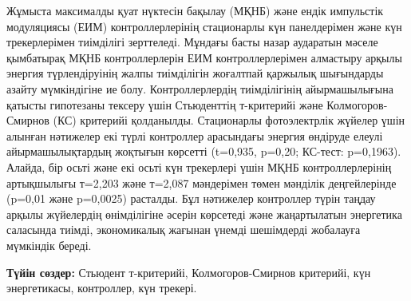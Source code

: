 Жұмыста максималды қуат нүктесін бақылау (МҚНБ) және ендік импульстік
модуляциясы (ЕИМ) контроллерлерінің стационарлы күн панелдерімен және
күн трекерлерімен тиімділігі зерттеледі. Мұндағы басты назар аударатын
мәселе қымбатырақ МҚНБ контроллерлерін ЕИМ контроллерлерімен алмастыру
арқылы энергия түрлендіруінің жалпы тиімділігін жоғалтпай қаржылық
шығындарды азайту мүмкіндігіне ие болу. Контроллерлердің тиімділігінің
айырмашылығына қатысты гипотезаны тексеру үшін Стьюденттің т-критерийі
және Колмогоров-Смирнов (КС) критерийі қолданылды. Стационарлы
фотоэлектрлік жүйелер үшін алынған нәтижелер екі түрлі контроллер
арасындағы энергия өндіруде елеулі айырмашылықтардың жоқтығын көрсетті
(t=0,935, p=0,20; КС-тест: p=0,1963). Алайда, бір осьті және екі осьті
күн трекерлері үшін МҚНБ контроллерлерінің артықшылығы т=2,203 және
т=2,087 мәндерімен төмен мәнділік деңгейлерінде (p=0,01 және p=0,0025)
расталды. Бұл нәтижелер контроллер түрін таңдау арқылы жүйелердің
өнімділігіне әсерін көрсетеді және жаңартылатын энергетика саласында
тиімді, экономикалық жағынан үнемді шешімдерді жобалауға мүмкіндік
береді.

{\bfseries Түйін сөздер:} Стьюдент т-критерийі, Колмогоров-Смирнов
критерийі, күн энергетикасы, контроллер, күн трекері.

